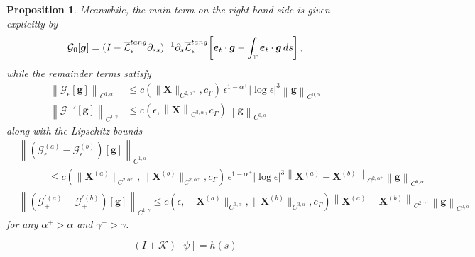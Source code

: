 \documentclass[10pt,a4paper]{amsart}
\newtheorem{proposition}{Proposition}
\newcommand{\T}{\mathbb{T}}
\newcommand{\X}{\bm{X}}
\newcommand{\abs}[1]{\left\lvert #1 \right\rvert}
\newcommand{\be}{\bm{e}}
\newcommand{\mc}[1]{\mathcal{#1}}
\newcommand{\norm}[1]{\left\lVert #1 \right\rVert}
\newcommand{\p}{\partial}
\begin{document}
\begin{proposition}
Meanwhile, the main term on the right hand side is given explicitly by
\begin{equation}
  \mc{G}_0[\bm{g}] = (I-\overline{\mc{L}}_\epsilon^{\rm tang}\p_{ss})^{-1}\p_s\overline{\mc{L}}_\epsilon^{\rm tang}\bigg[\be_{\rm t}\cdot\bm{g}-\int_\T\be_{\rm t}\cdot\bm{g}\,ds \bigg]\,,
\end{equation}
while the remainder terms satisfy 
\begin{equation}
\begin{aligned}
  \norm{\mc{G}_\epsilon[\bm{g}]}_{C^{1,\alpha}}&\le c(\|\X\|_{C^{2,\alpha^+}},c_\Gamma)\,\epsilon^{1-\alpha^+}\abs{\log\epsilon}^3\norm{\bm{g}}_{C^{0,\alpha}}\\
  \norm{\mc{G}_+'[\bm{g}]}_{C^{1,\gamma}}&\le c(\epsilon,\norm{\X}_{C^{3,\alpha}},c_\Gamma)\norm{\bm{g}}_{C^{0,\alpha}}
\end{aligned}
\end{equation}
along with the Lipschitz bounds
\begin{equation}
\begin{aligned}
  &\norm{(\mc{G}_\epsilon^{(a)}-\mc{G}_\epsilon^{(b)})[\bm{g}]}_{C^{1,\alpha}}\\
  &\quad\qquad\le c(\|\X^{(a)}\|_{C^{2,\alpha^+}},\|\X^{(b)}\|_{C^{2,\alpha^+}},c_\Gamma)\,\epsilon^{1-\alpha^+}\abs{\log\epsilon}^3\norm{\X^{(a)}-\X^{(b)}}_{C^{2,\alpha^+}}\norm{\bm{g}}_{C^{0,\alpha}}\\
  &\norm{(\mc{G}_+^{'(a)}-\mc{G}_+^{'(b)})[\bm{g}]}_{C^{1,\gamma}}\le c(\epsilon,\|\X^{(a)}\|_{C^{3,\alpha}},\|\X^{(b)}\|_{C^{3,\alpha}},c_\Gamma)\norm{\X^{(a)}-\X^{(b)}}_{C^{2,\gamma^+}}\norm{\bm{g}}_{C^{0,\alpha}}
\end{aligned}
\end{equation}
for any $\alpha^+>\alpha$ and $\gamma^+>\gamma$.
\end{proposition}

\begin{equation}\label{eq:TDP_h}
(I+\mc{K})[\psi] = h(s)
\end{equation}
\end{document}
